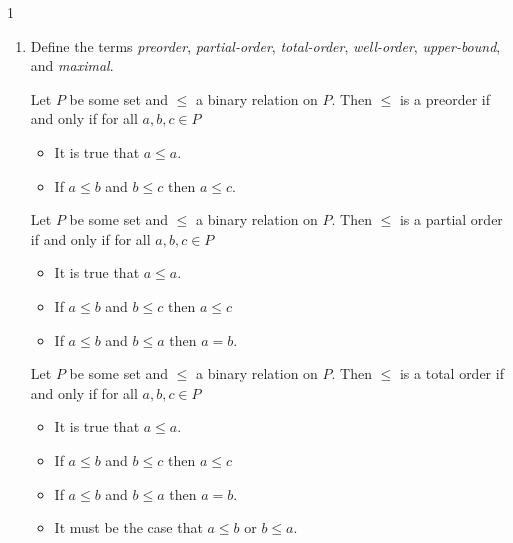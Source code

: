 \documentclass{exercises}
\begin{document}

\begin{exr}{}{1}
	\begin{enumerate}
		\item Define the terms \emph{preorder}, \emph{partial-order}, \emph{total-order}, \emph{well-order}, \emph{upper-bound}, and \emph{maximal}.

		\begin{definition}
			Let $P$ be some set and $\leq$ a binary relation on $P$. Then $\leq$ is a preorder if and only if for all $a, b, c \in P$
			\begin{itemize}
				\item It is true that $a \leq a$.
				\item If $a \leq b$ and $b \leq c$ then $a \leq c$.
			\end{itemize}
		\end{definition}


		\begin{definition}
			Let $P$ be some set and $\leq$ a binary relation on $P$. Then $\leq$ is a partial order if and only if for all $a, b, c \in P$
			\begin{itemize}
				\item It is true that $a \leq a$.
				\item If $a \leq b$ and $b \leq c$ then $a \leq c$
				\item If $a \leq b$ and $b \leq a$ then $a = b.$
			\end{itemize}
		\end{definition}


		\begin{definition}
			Let $P$ be some set and $\leq$ a binary relation on $P$. Then $\leq$ is a total order if and only if for all $a, b, c \in P$
			\begin{itemize}
				\item It is true that $a \leq a$.
				\item If $a \leq b$ and $b \leq c$ then $a \leq c$
				\item If $a \leq b$ and $b \leq a$ then $a = b.$
				\item It must be the case that $a \leq b$ or $b \leq a$.
			\end{itemize}
		\end{definition}


\end{enumerate}
\end{exr}
\end{document}
